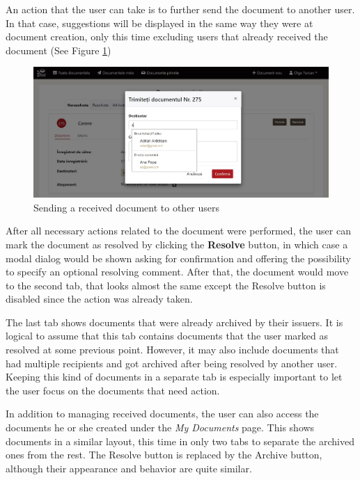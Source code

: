 An action that the user can take is to further send the document to another user. In that case, suggestions will be displayed in the same way they were at document creation, only this time excluding users that already received the document (See Figure \ref{resendModal})

\begin{figure}[ht]
    \centering
    \includegraphics[width=5.5in]{images/app/received_resend_modal}
    \caption{Sending a received document to other users}
    \label{resendModal}
\end{figure}

After all necessary actions related to the document were performed, the user can mark the document as resolved by clicking the \textbf{Resolve} button, in which case a modal dialog would be shown asking for confirmation and offering the possibility to specify an optional resolving comment. After that, the document would move to the second tab, that looks almost the same except the Resolve button is disabled since the action was already taken.

The last tab shows documents that were already archived by their issuers. It is logical to assume that this tab contains documents that the user marked as resolved at some previous point. However, it may also include documents that had multiple recipients and got archived after being resolved by another user. Keeping this kind of documents in a separate tab is especially important to let the user focus on the documents that need action.

In addition to managing received documents, the user can also access the documents he or she created under the \textit{My Documents} page. This shows documents in a similar layout, this time in only two tabs to separate the archived ones from the rest. The Resolve button is replaced by the Archive button, although their appearance and behavior are quite similar.

